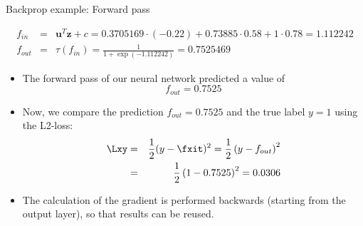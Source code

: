 \begin{vbframe}{Backprop example: Forward pass}
\vspace*{-0.5cm}

  \begin{footnotesize}
    \begin{eqnarray*}
    f_{in} &=& \bm{u}^T \bm{z} + c = \num[round-mode=places,round-precision=4]{0.3705169} \cdot (-0.22) + \num[round-mode=places,round-precision=4]{0.73885} \cdot 0.58 + 1 \cdot 0.78 = \num[round-mode=places,round-precision=4]{1.112242} \\
    f_{out} &=& \tau\left(f_{in}\right) = \frac{1}{1+\exp(\num[round-mode=places,round-precision=4]{-1.112242})} = \num[round-mode=places,round-precision=4]{0.7525469}
    \end{eqnarray*}
  \end{footnotesize}
\framebreak

  \begin{itemize}
    \item The forward pass of our neural network predicted a value of $$f_{out} = 0.7525$$
    \item Now, we compare the prediction $f_{out} = 0.7525$ and the true label $y = 1$ using the L2-loss: 
      \begin{eqnarray*}
        \Lxy &=& \frac{1}{2}(y - \fxit)^2 = \frac{1}{2}\left(y - f_{out}\right)^{2} \\
                  &=& \frac{1}{2}\left(1 - \num[round-mode=places,round-precision=4]{0.7525469}\right)^2 = \num[round-mode=places,round-precision=4]{0.03061652}
      \end{eqnarray*}
    \item The calculation of the gradient is performed backwards (starting from the output layer), so that results can be reused. 
\end{itemize}
\end{vbframe}

